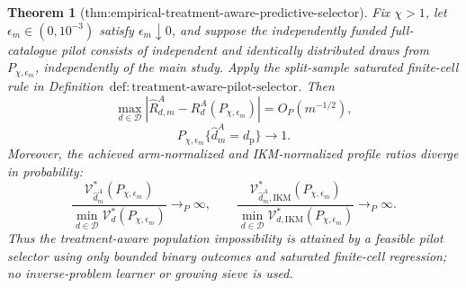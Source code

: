 \documentclass{article}
\newtheorem{theorem}{Theorem}
\begin{document}
\begin{theorem}[thm:empirical-treatment-aware-predictive-selector]\label{thm:empirical-treatment-aware-predictive-selector}
Fix \(\chi>1\), let \(\epsilon_m\in(0,10^{-3})\) satisfy \(\epsilon_m\downarrow0\), and suppose the independently funded full-catalogue pilot consists of independent and identically distributed draws from \(P_{\chi,\epsilon_m}\), independently of the main study. Apply the split-sample saturated finite-cell rule in Definition~\(\mathrm{def{:}treatment\text{-}aware\text{-}pilot\text{-}selector}\). Then
\[
 \max_{d\in\mathcal D}
 |\widehat R_{d,m}^A-R_d^A(P_{\chi,\epsilon_m})|=O_P(m^{-1/2}), \tag{1}
\]
\[
 P_{\chi,\epsilon_m}\{\widehat d_m^A=d_{\mathrm p}\}\longrightarrow1. \tag{2}
\]
Moreover, the achieved arm-normalized and IKM-normalized profile ratios diverge in probability:
\[
 \frac{\mathcal V_{\widehat d_m^A}^*(P_{\chi,\epsilon_m})}
 {\min_{d\in\mathcal D}\mathcal V_d^*(P_{\chi,\epsilon_m})}
 \longrightarrow_P\infty,
 \qquad
 \frac{\mathcal V_{\widehat d_m^A,\mathrm{IKM}}^*(P_{\chi,\epsilon_m})}
 {\min_{d\in\mathcal D}\mathcal V_{d,\mathrm{IKM}}^*(P_{\chi,\epsilon_m})}
 \longrightarrow_P\infty. \tag{3}
\]
Thus the treatment-aware population impossibility is attained by a feasible pilot selector using only bounded binary outcomes and saturated finite-cell regression; no inverse-problem learner or growing sieve is used.
\end{theorem}
\end{document}
